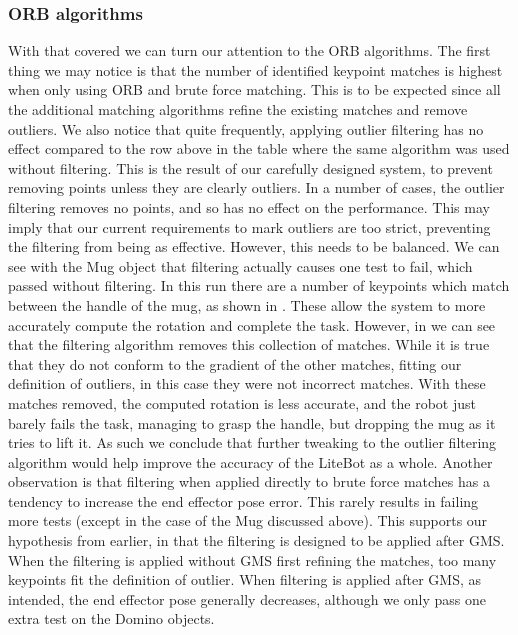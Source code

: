 \subsubsection{ORB algorithms}
With that covered we can turn our attention to the ORB algorithms. The first thing we may notice is that the number of identified keypoint matches is highest when only using ORB and brute force matching. This is to be expected since all the additional matching algorithms refine the existing matches and remove outliers. We also notice that quite frequently, applying outlier filtering has no effect compared to the row above in the table where the same algorithm was used without filtering. This is the result of our carefully designed system, to prevent removing points unless they are clearly outliers. In a number of cases, the outlier filtering removes no points, and so has no effect on the performance. This may imply that our current requirements to mark outliers are too strict, preventing the filtering from being as effective. However, this needs to be balanced. We can see with the Mug object that filtering actually causes one test to fail, which passed without filtering. In this run there are a number of keypoints which match between the handle of the mug, as shown in . These allow the system to more accurately compute the rotation and complete the task. However, in  we can see that the filtering algorithm removes this collection of matches. While it is true that they do not conform to the gradient of the other matches, fitting our definition of outliers, in this case they were not incorrect matches. With these matches removed, the computed rotation is less accurate, and the robot just barely fails the task, managing to grasp the handle, but dropping the mug as it tries to lift it. As such we conclude that further tweaking to the outlier filtering algorithm would help improve the accuracy of the LiteBot as a whole. Another observation is that filtering when applied directly to brute force matches has a tendency to increase the end effector pose error. This rarely results in failing more tests (except in the case of the Mug discussed above). This supports our hypothesis from earlier, in that the filtering is designed to be applied after GMS. When the filtering is applied without GMS first refining the matches, too many keypoints fit the definition of outlier. When filtering is applied after GMS, as intended, the end effector pose generally decreases, although we only pass one extra test on the Domino objects.

